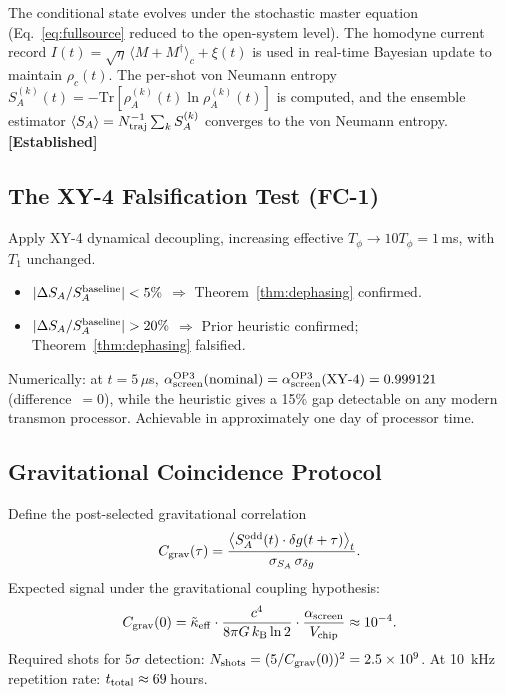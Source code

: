 \documentclass[12pt,letterpaper]{article}
\theoremstyle{definition}
\theoremstyle{remark}
\newcommand{\established}{\textbf{[Established]}}
\newcommand{\ascreen}{\alpha_{\rm screen}}
\newcommand{\keff}{\tilde{\kappa}_{\rm eff}}
\newcommand{\kB}{k_{\rm B}}
\begin{document}
The conditional state evolves under the stochastic master equation (Eq.~\eqref{eq:fullsource} reduced to the open-system level).
The homodyne current record $I(t) = \sqrt{\eta}\,\langle M+M^\dagger\rangle_c + \xi(t)$
is used in real-time Bayesian update to maintain $\rho_c(t)$.
The per-shot von Neumann entropy $S_A^{(k)}(t) = -\mathrm{Tr}[\rho_A^{(k)}(t)\ln\rho_A^{(k)}(t)]$
is computed, and the ensemble estimator $\langle S_A\rangle = N_{\rm traj}^{-1}\sum_k S_A^{(k)}$
converges to the von Neumann entropy.~\cite{jacobs2006} \established{}

\subsection{The XY-4 Falsification Test (FC-1)}

Apply XY-4 dynamical decoupling, increasing effective $T_\phi\to 10T_\phi = 1\,$ms,
with $T_1$ unchanged.
\begin{itemize}[noitemsep]
\item $|\Delta S_A/S_A^{\rm baseline}| < 5\%$
      $\Rightarrow$ Theorem~\ref{thm:dephasing} confirmed.
\item $|\Delta S_A/S_A^{\rm baseline}| > 20\%$
      $\Rightarrow$ Prior heuristic confirmed; Theorem~\ref{thm:dephasing} falsified.
\end{itemize}
Numerically: at $t = 5\,\mu$s, $\ascreen^{\rm OP3}({\rm nominal}) = \ascreen^{\rm OP3}({\rm XY\text{-}4}) = 0.999121$ (difference~$= 0$), while the heuristic gives a 15\% gap detectable on any modern transmon processor.
Achievable in approximately one day of processor time.

\subsection{Gravitational Coincidence Protocol}

Define the post-selected gravitational correlation
\begin{equation}
C_{\rm grav}(\tau)
  = \frac{\bigl\langle S_A^{\rm odd}(t)\cdot\delta g(t+\tau)\bigr\rangle_t}
         {\sigma_{S_A}\,\sigma_{\delta g}}.
\label{eq:Cgrav}
\end{equation}
Expected signal under the gravitational coupling hypothesis:
\begin{equation}
C_{\rm grav}(0) = \keff\cdot\frac{c^4}{8\pi G\,\kB\ln 2}\cdot
  \frac{\ascreen}{V_{\rm chip}} \approx 10^{-4}.
\label{eq:signal}
\end{equation}
Required shots for $5\sigma$ detection:
$N_{\rm shots} = (5/C_{\rm grav}(0))^2 = 2.5\times 10^9$.
At 10~kHz repetition rate: $t_{\rm total}\approx 69\,$hours.
\end{document}
